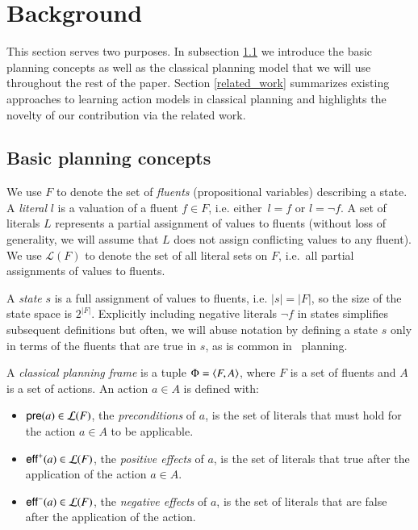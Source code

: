 
\section{Background}
\label{sec:background}

This section serves two purposes. In subsection \ref{basic_planning} we introduce the basic planning concepts as well as the classical planning model that we will use throughout the rest of the paper. Section \ref{related_work} summarizes existing approaches to learning action models in classical planning and highlights the novelty of our contribution via the related work.



\subsection{Basic planning concepts}
\label{basic_planning}


We use $F$ to denote the set of {\em fluents} (propositional variables) describing a state. A {\em literal} $l$ is a valuation of a fluent $f\in F$, i.e. either~$l=f$ or $l=\neg f$. A set of literals $L$ represents a partial assignment of values to fluents (without loss of generality, we will assume that $L$ does not assign conflicting values to any fluent). We use $\mathcal{L}(F)$ to denote the set of all literal sets on $F$, i.e.~all partial assignments of values to fluents.

A {\em state} $s$ is a full assignment of values to fluents, i.e. $|s|=|F|$, so the size of the state space is $2^{|F|}$. Explicitly including negative literals $\neg f$ in states simplifies subsequent definitions but often, we will abuse notation by defining a state $s$ only in terms of the fluents that are true in $s$, as is common in \strips\ planning.

A {\em classical planning frame} is a tuple $\Phi={\langle F,A \rangle}$, where $F$ is a set of fluents and $A$ is a set of actions. An action $a\in A$ is defined with:


\begin{itemize}
\item $\mathsf{pre}(a)\in\mathcal{L}(F)$, the {\em preconditions} of $a$, is the set of literals that must hold for the action $a\in A$ to be applicable.
\item $\mathsf{eff}^+(a)\in\mathcal{L}(F)$, the {\em positive effects} of $a$, is the set of literals that true after the application of the action $a\in A$.
\item $\mathsf{eff}^-(a)\in\mathcal{L}(F)$, the {\em negative effects} of $a$, is the set of literals that are false after the application of the action.
\end{itemize}

